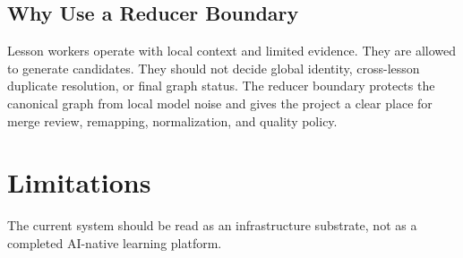 \documentclass[11pt,letterpaper]{article}
\begin{document}
\subsection{Why Use a Reducer Boundary}

Lesson workers operate with local context and limited evidence. They are allowed to generate candidates. They should not decide global identity, cross-lesson duplicate resolution, or final graph status. The reducer boundary protects the canonical graph from local model noise and gives the project a clear place for merge review, remapping, normalization, and quality policy.

\section{Limitations}

The current system should be read as an infrastructure substrate, not as a completed AI-native learning platform.
\end{document}
